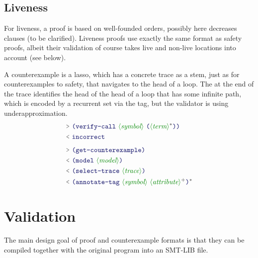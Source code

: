 \documentclass[runningheads]{llncs}
\begin{document}
\subsection{Liveness}

For liveness, a proof is based on well-founded orders,
possibly here decreases clauses (to be clarified).
Liveness proofs use exactly the same format as safety proofs,
albeit their validation of course takes live and non-live locations into account
(see below).

A counterexample is a lasso,
which has a concrete trace as a stem, just as for counterexamples to safety,
that navigates to the head of a loop.
The  at the end of the trace
identifies the head of the head of a loop that has some infinite path,
which is encoded by a recurrent set via the  tag,
but the validator is using underapproximation.
\begin{align*}
\QRY~ & \LP \terminal{verify-call}~
            \nonterminal{symbol}~
            \LP \nonterminal{term}\rstar \RP
        \RP \notag \\
\RES~ & \terminal{incorrect} \\[4pt]
\QRY~ & \LP \terminal{get-counterexample} \RP \\
\RES~ & \LP \terminal{model}~  \nonterminal{model} \RP \\
\RES~ & \LP \terminal{select-trace}~  \nonterminal{trace} \RP \\
\RES~ & \LP \terminal{annotate-tag}~
           \nonterminal{symbol}~
           \nonterminal{attribute}\rplus
                 \RP \rstar
\end{align*}

% 

\section{Validation}

The main design goal of proof and counterexample formats is
that they can be compiled together with the original program
into an SMT-LIB file.
\end{document}
